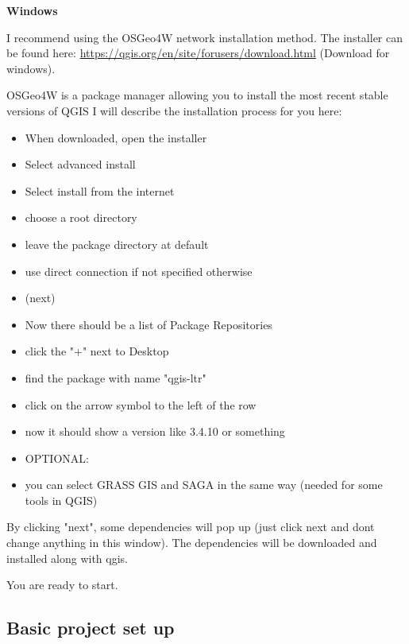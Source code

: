 \documentclass[12pt,a4paper]{scrartcl}
\begin{document}
\textbf{Windows} \newline

I recommend using the OSGeo4W network installation method. \newline
The installer can be found here: \url{https://qgis.org/en/site/forusers/download.html} (Download for windows).

OSGeo4W is a package manager allowing you to install the most recent stable versions of QGIS
I will describe the installation process for you here: \newline

\begin{itemize}

\item When downloaded, open the installer
\item Select advanced install
\item Select install from the internet
\item choose a root directory 
\item leave the package directory at default
\item use direct connection if not specified otherwise
\item (next)
\item Now there should be a list of Package Repositories
\item click the "+" next to Desktop
\item find the package with name "qgis-ltr"
\item click on the arrow symbol to the left of the row
\item now it should show a version like 3.4.10 or something

\item OPTIONAL: 
\item you can select GRASS GIS and SAGA in the same way (needed for some tools in QGIS)

\end{itemize}

By clicking "next", some dependencies will pop up (just click next and dont change anything in this window).
The dependencies will be downloaded and installed along with qgis.\newline

You are ready to start.

\subsection{Basic project set up}
\label{step2}
\end{document}
